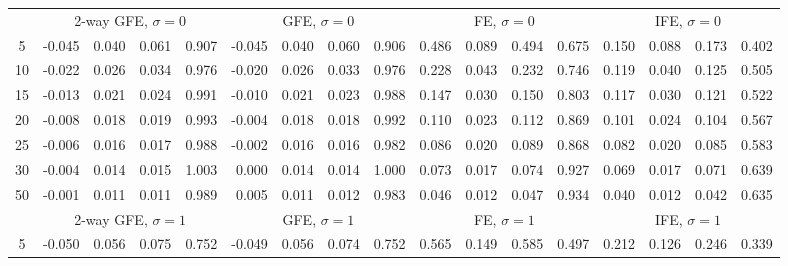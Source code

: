 \documentclass{article}
\begin{document}
{\begin{tabular}{c r r r r r r r r r r r r r r r r}
 & \multicolumn{ 4 }{c}{ 2-way GFE, $\sigma{=}0$} & \multicolumn{ 4 }{c}{ GFE, $\sigma{=}0$} & \multicolumn{ 4 }{c}{ FE, $\sigma{=}0$} & \multicolumn{ 4 }{c}{ IFE, $\sigma{=}0$}\\[-3pt]
 \cmidrule(lr){2-5}  \cmidrule(lr){6-9}  \cmidrule(lr){10-13}  \cmidrule(lr){14-17}
5 &     -0.045 &      0.040 &      0.061 &      0.907 &     -0.045 &      0.040 &      0.060 &      0.906 &      0.486 &      0.089 &      0.494 &      0.675 &      0.150 &      0.088 &      0.173 &      0.402\\
10 &     -0.022 &      0.026 &      0.034 &      0.976 &     -0.020 &      0.026 &      0.033 &      0.976 &      0.228 &      0.043 &      0.232 &      0.746 &      0.119 &      0.040 &      0.125 &      0.505\\
15 &     -0.013 &      0.021 &      0.024 &      0.991 &     -0.010 &      0.021 &      0.023 &      0.988 &      0.147 &      0.030 &      0.150 &      0.803 &      0.117 &      0.030 &      0.121 &      0.522\\
20 &     -0.008 &      0.018 &      0.019 &      0.993 &     -0.004 &      0.018 &      0.018 &      0.992 &      0.110 &      0.023 &      0.112 &      0.869 &      0.101 &      0.024 &      0.104 &      0.567\\
25 &     -0.006 &      0.016 &      0.017 &      0.988 &     -0.002 &      0.016 &      0.016 &      0.982 &      0.086 &      0.020 &      0.089 &      0.868 &      0.082 &      0.020 &      0.085 &      0.583\\
30 &     -0.004 &      0.014 &      0.015 &      1.003 &      0.000 &      0.014 &      0.014 &      1.000 &      0.073 &      0.017 &      0.074 &      0.927 &      0.069 &      0.017 &      0.071 &      0.639\\
50 &     -0.001 &      0.011 &      0.011 &      0.989 &      0.005 &      0.011 &      0.012 &      0.983 &      0.046 &      0.012 &      0.047 &      0.934 &      0.040 &      0.012 &      0.042 &      0.635\\[0pt]
 & \multicolumn{ 4 }{c}{ 2-way GFE, $\sigma{=}1$} & \multicolumn{ 4 }{c}{ GFE, $\sigma{=}1$} & \multicolumn{ 4 }{c}{ FE, $\sigma{=}1$} & \multicolumn{ 4 }{c}{ IFE, $\sigma{=}1$}\\[-3pt]
 \cmidrule(lr){2-5}  \cmidrule(lr){6-9}  \cmidrule(lr){10-13}  \cmidrule(lr){14-17}
5 &     -0.050 &      0.056 &      0.075 &      0.752 &     -0.049 &      0.056 &      0.074 &      0.752 &      0.565 &      0.149 &      0.585 &      0.497 &      0.212 &      0.126 &      0.246 &      0.339\\

\end{tabular}}
\end{document}
